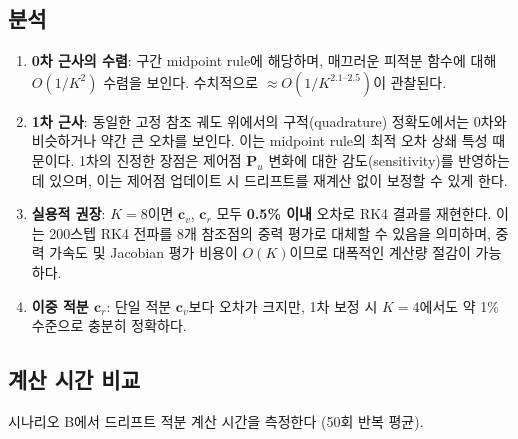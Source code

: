 \documentclass[11pt]{article}
\begin{document}
\subsection{분석}

\begin{enumerate}
  \item \textbf{0차 근사의 수렴}: 구간 midpoint rule에 해당하며,
        매끄러운 피적분 함수에 대해 $O(1/K^2)$ 수렴을 보인다.
        수치적으로 $\approx O(1/K^{2.1\text{--}2.5})$이 관찰된다.
  \item \textbf{1차 근사}: 동일한 고정 참조 궤도 위에서의 구적(quadrature)
        정확도에서는 0차와 비슷하거나 약간 큰 오차를 보인다.
        이는 midpoint rule의 최적 오차 상쇄 특성 때문이다.
        1차의 진정한 장점은 제어점 $\mathbf{P}_u$ 변화에 대한
        감도(sensitivity)를 반영하는 데 있으며,
        이는 제어점 업데이트 시 드리프트를 재계산 없이 보정할 수 있게 한다.
  \item \textbf{실용적 권장}: $K=8$이면 $\mathbf{c}_v$, $\mathbf{c}_r$ 모두
        \textbf{0.5\% 이내} 오차로 RK4 결과를 재현한다.
        이는 200스텝 RK4 전파를 8개 참조점의 중력 평가로 대체할 수 있음을 의미하며,
        중력 가속도 및 Jacobian 평가 비용이 $O(K)$이므로 대폭적인 계산량 절감이 가능하다.
  \item \textbf{이중 적분 $\mathbf{c}_r$}: 단일 적분 $\mathbf{c}_v$보다 오차가 크지만,
        1차 보정 시 $K=4$에서도 약 1\% 수준으로 충분히 정확하다.
\end{enumerate}

\subsection{계산 시간 비교}

시나리오 B에서 드리프트 적분 계산 시간을 측정한다 (50회 반복 평균).
\end{document}
